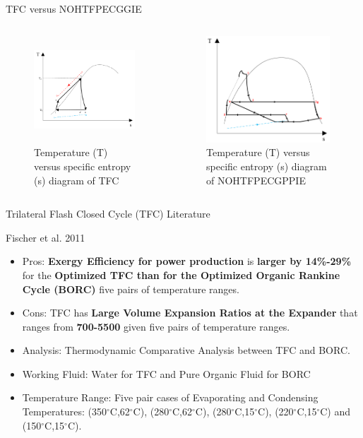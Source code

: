 \begin{frame}{TFC versus NOHTFPECGGIE}
\begin{columns}
    \begin{figure}[h]
      \centering
      \includegraphics[height=4cm]{images/tfctsdiagram.png}
      \caption{\scriptsize \centering Temperature (T) versus specific entropy (s) diagram of TFC \cite{smith2014power}}
   \end{figure}
    \begin{figure}[h]
    \centering
    \includegraphics[height=4cm]{images/nohtfpecgppietsdiagram1.png}
    \caption{\scriptsize \centering Temperature (T) versus specific entropy (s) diagram of NOHTFPECGPPIE}
    \end{figure}
\end{columns}
\end{frame}

\begin{frame}{Trilateral Flash Closed Cycle (TFC) Literature}
    \begin{block}{Fischer et al. 2011 \cite{fischer2011comparison}}
    \begin{itemize}
        \item Pros: \textbf{Exergy Efficiency for power production} is \textbf{larger by 14\%-29\%} for the \textbf{Optimized TFC than for the Optimized Organic Rankine Cycle (BORC)} five pairs of temperature ranges.
        \item Cons: TFC has \textbf{Large Volume Expansion Ratios at the Expander} that ranges from \textbf{700-5500} given five pairs of temperature ranges.
        \item Analysis: Thermodynamic Comparative Analysis between TFC and BORC.
        \item  Working Fluid: Water for TFC and Pure Organic Fluid for BORC
        \item Temperature Range: Five pair cases of Evaporating and Condensing Temperatures: (350$^\circ$C,62$^\circ$C), (280$^\circ$C,62$^\circ$C), (280$^\circ$C,15$^\circ$C), (220$^\circ$C,15$^\circ$C) and (150$^\circ$C,15$^\circ$C).
    \end{itemize}
    \end{block}
\end{frame}

